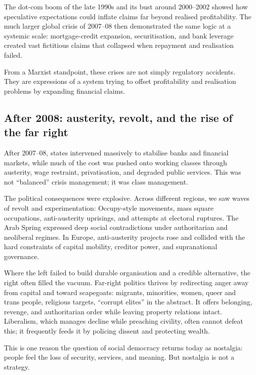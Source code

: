 The dot-com boom of the late 1990s and its bust around 2000--2002 showed how speculative expectations could inflate
claims far beyond realised profitability. The much larger global crisis of 2007--08 then demonstrated the same logic
at a systemic scale: mortgage-credit expansion, securitisation, and bank leverage created vast fictitious claims that
collapsed when repayment and realisation failed.

From a Marxist standpoint, these crises are not simply regulatory accidents. They are expressions of a system trying
to offset profitability and realisation problems by expanding financial claims.

\subsection{After 2008: austerity, revolt, and the rise of the far right}
\label{subsec:post-2008}

After 2007--08, states intervened massively to stabilise banks and financial markets, while much of the cost was pushed
onto working classes through austerity, wage restraint, privatisation, and degraded public services. This was not
``balanced'' crisis management; it was class management.

The political consequences were explosive. Across different regions, we saw waves of revolt and experimentation:
Occupy-style movements, mass square occupations, anti-austerity uprisings, and attempts at electoral ruptures. The Arab
Spring expressed deep social contradictions under authoritarian and neoliberal regimes. In Europe, anti-austerity
projects rose and collided with the hard constraints of capital mobility, creditor power, and supranational governance.

Where the left failed to build durable organisation and a credible alternative, the right often filled the vacuum.
Far-right politics thrives by redirecting anger away from capital and toward scapegoats: migrants, minorities, women,
queer and trans people, religious targets, ``corrupt elites'' in the abstract. It offers belonging, revenge, and
authoritarian order while leaving property relations intact. Liberalism, which manages decline while preaching civility,
often cannot defeat this; it frequently feeds it by policing dissent and protecting wealth.

This is one reason the question of social democracy returns today as nostalgia: people feel the loss of security,
services, and meaning. But nostalgia is not a strategy.

